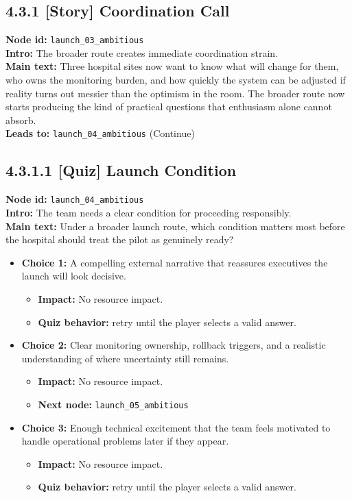 \documentclass[11pt]{article}
\begin{document}
\subsection*{4.3.1 [Story] Coordination Call}
\textbf{Node id:} \texttt{launch\_03\_ambitious}\\
\textbf{Intro:} The broader route creates immediate coordination strain.\\
\textbf{Main text:} Three hospital sites now want to know what will change for them, who owns the monitoring burden, and how quickly the system can be adjusted if reality turns out messier than the optimism in the room. The broader route now starts producing the kind of practical questions that enthusiasm alone cannot absorb.\\
\textbf{Leads to:} \texttt{launch\_04\_ambitious} (Continue)\\
\subsection*{4.3.1.1 [Quiz] Launch Condition}
\textbf{Node id:} \texttt{launch\_04\_ambitious}\\
\textbf{Intro:} The team needs a clear condition for proceeding responsibly.\\
\textbf{Main text:} Under a broader launch route, which condition matters most before the hospital should treat the pilot as genuinely ready?\\
\begin{itemize}
\item \textbf{Choice 1:} A compelling external narrative that reassures executives the launch will look decisive.
\begin{itemize}
\item \textbf{Impact:} No resource impact.
\item \textbf{Quiz behavior:} retry until the player selects a valid answer.
\end{itemize}
\item \textbf{Choice 2:} Clear monitoring ownership, rollback triggers, and a realistic understanding of where uncertainty still remains.
\begin{itemize}
\item \textbf{Impact:} No resource impact.
\item \textbf{Next node:} \texttt{launch\_05\_ambitious}
\end{itemize}
\item \textbf{Choice 3:} Enough technical excitement that the team feels motivated to handle operational problems later if they appear.
\begin{itemize}
\item \textbf{Impact:} No resource impact.
\item \textbf{Quiz behavior:} retry until the player selects a valid answer.
\end{itemize}
\end{itemize}
\end{document}
